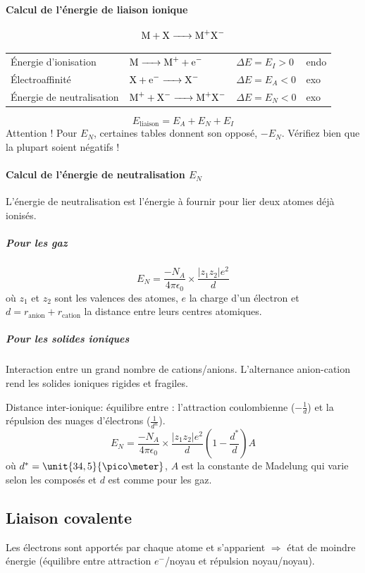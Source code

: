 \documentclass[11pt,a4paper,french]{article}
\begin{document}
\paragraph{Calcul de l'énergie de liaison ionique}
\[ \ce{M + X -> M+X-} \]
\begin{center}
	\begin{tabular}{llll}
		\'Energie d'ionisation & $\ce{M -> M+ + e-}$ & $\Delta E = E_I > 0$ & endo\\
		\'Electroaffinité & $\ce{X + e- -> X-}$ & $\Delta E = E_A < 0$ & exo\\
		\'Energie de neutralisation & $\ce{M+ + X- -> M+X-}$ & $\Delta E = E_N < 0$ & exo
	\end{tabular}
\end{center}
\[ E_{\mathrm{liaison}} = E_A + E_N + E_I \]
Attention !
Pour $E_N$, certaines tables donnent son opposé, $-E_N$.
Vérifiez bien que la plupart soient négatifs !

\paragraph{Calcul de l'énergie de neutralisation $E_N$}
\label{sec:neutral}
L'énergie de neutralisation est l'énergie à fournir pour lier deux atomes déjà ionisés.

\subparagraph{Pour les gaz}
\[ E_N = \frac{-N_A}{4\pi\epsilon_0}\times\frac{|z_1z_2|e^2}{d} \]
où $z_1$ et $z_2$ sont les valences des atomes, $e$ la charge d'un électron et $d = r_{\mathrm{anion}} + r_{\mathrm{cation}}$ la distance entre leurs centres atomiques.
\subparagraph{Pour les solides ioniques}
Interaction entre un grand nombre de cations/anions.
L'alternance anion-cation rend les solides ioniques rigides et fragiles.

Distance inter-ionique: équilibre entre : l'attraction coulombienne ($-\frac{1}{d}$) et la répulsion des nuages d'électrons ($\frac{1}{d^n}$).
\[ E_N = \frac{-N_A}{4\pi\epsilon_0}\times\frac{|z_1z_2|e^2}{d} \left(1-\frac{d^*}{d}\right)A \]
où $d^* = \unit{34,5}{\pico\meter}$, $A$ est la constante de Madelung qui varie selon les composés et $d$ est comme pour les gaz.

\subsection{Liaison covalente}

Les électrons sont apportés par chaque atome et s'apparient $\Rightarrow$ état de moindre énergie (équilibre entre attraction $e^-$/noyau et répulsion noyau/noyau).
\end{document}
